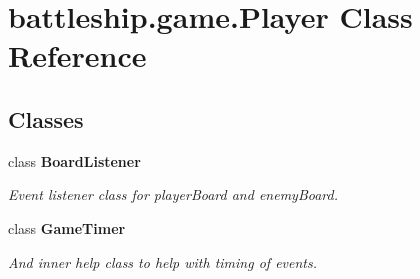 \hypertarget{classbattleship_1_1game_1_1Player}{}\section{battleship.\+game.\+Player Class Reference}
\label{classbattleship_1_1game_1_1Player}
\subsection*{Classes}
\begin{DoxyCompactItemize}
\item 
class {\bfseries Board\+Listener}
\begin{DoxyCompactList}\small\item\em Event listener class for player\+Board and enemy\+Board. \end{DoxyCompactList}\item 
class {\bfseries Game\+Timer}
\begin{DoxyCompactList}\small\item\em And inner help class to help with timing of events. \end{DoxyCompactList}\end{DoxyCompactItemize}
